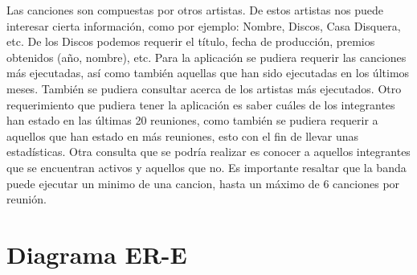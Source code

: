 \documentclass[12pt,a4paper,spanish]{article}
\begin{document}
    \newline
	\indent Las canciones son compuestas por otros artistas. De estos artistas nos puede interesar cierta informaci\'on, como por ejemplo: Nombre, Discos, Casa Disquera, etc. De los Discos podemos requerir el t\'itulo, fecha de producci\'on, premios obtenidos (a\~no, nombre), etc.
	\newline
	\newline
	\indent Para la aplicaci\'on se pudiera requerir las canciones m\'as ejecutadas, as\'i como tambi\'en aquellas que han sido ejecutadas en los \'ultimos meses. Tambi\'en se pudiera consultar acerca de los artistas m\'as ejecutados.
    \newline
    \newline
    \indent Otro requerimiento que pudiera tener la aplicaci\'on es saber cu\'ales de los integrantes han estado en las \'ultimas 20 reuniones, como tambi\'en se pudiera requerir a aquellos que han estado en m\'as reuniones, esto con el fin de llevar unas estad\'isticas.
    \newline
    \newline
    \indent Otra consulta que se podr\'ia realizar es conocer a aquellos integrantes que se encuentran activos y aquellos que no.
    \newline
    \newline
    \indent Es importante resaltar que la banda puede ejecutar un minimo de una cancion, hasta un m\'aximo de 6 canciones por reuni\'on.
	
\section{Diagrama ER-E}
\end{document}
